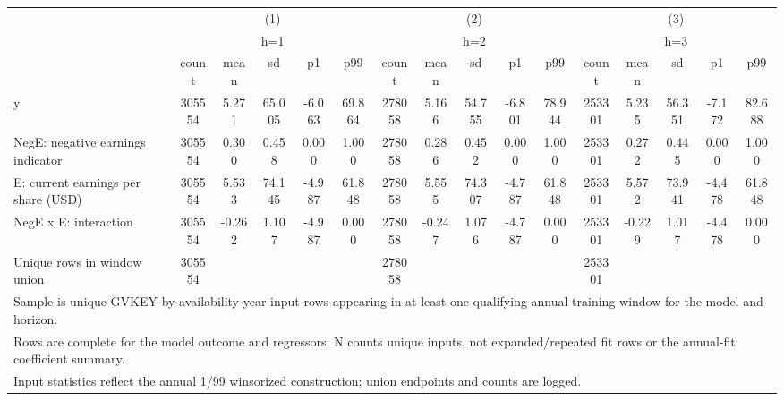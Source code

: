 \begin{tabular}{l*{3}{ccccc}}
\hline\hline
                    &\multicolumn{5}{c}{(1)}                                         &\multicolumn{5}{c}{(2)}                                         &\multicolumn{5}{c}{(3)}                                         \\
                    &\multicolumn{5}{c}{h=1}                                         &\multicolumn{5}{c}{h=2}                                         &\multicolumn{5}{c}{h=3}                                         \\
                    &       count&        mean&          sd&          p1&         p99&       count&        mean&          sd&          p1&         p99&       count&        mean&          sd&          p1&         p99\\
\hline
y                   &      305554&       5.271&      65.005&      -6.063&      69.864&      278058&       5.166&      54.755&      -6.801&      78.944&      253301&       5.235&      56.351&      -7.172&      82.688\\
NegE: negative earnings indicator&      305554&       0.300&       0.458&       0.000&       1.000&      278058&       0.286&       0.452&       0.000&       1.000&      253301&       0.272&       0.445&       0.000&       1.000\\
E: current earnings per share (USD)&      305554&       5.533&      74.145&      -4.987&      61.848&      278058&       5.555&      74.307&      -4.787&      61.848&      253301&       5.572&      73.941&      -4.478&      61.848\\
NegE x E: interaction&      305554&      -0.262&       1.107&      -4.987&       0.000&      278058&      -0.247&       1.076&      -4.787&       0.000&      253301&      -0.229&       1.017&      -4.478&       0.000\\
\hline
Unique rows in window union&      305554&            &            &            &            &      278058&            &            &            &            &      253301&            &            &            &            \\
\hline\hline
\multicolumn{16}{l}{\footnotesize Sample is unique GVKEY-by-availability-year input rows appearing in at least one qualifying annual training window for the model and horizon.}\\
\multicolumn{16}{l}{\footnotesize Rows are complete for the model outcome and regressors; N counts unique inputs, not expanded/repeated fit rows or the annual-fit coefficient summary.}\\
\multicolumn{16}{l}{\footnotesize Input statistics reflect the annual 1/99 winsorized construction; union endpoints and counts are logged.}\\
\end{tabular}

